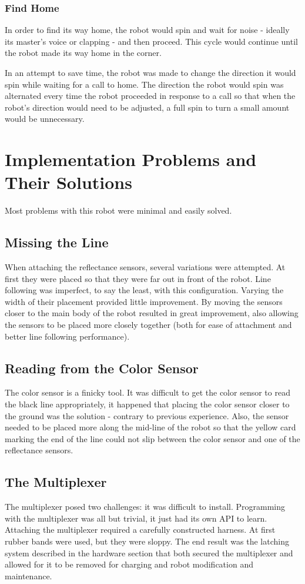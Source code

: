 \documentclass{article}
\begin{document}
\subsubsection{Find Home}
In order to find its way home, the robot would spin and wait for noise - ideally its master's voice or clapping - and then proceed. This cycle would continue until the robot made its way home in the corner.

In an attempt to save time, the robot was made to change the direction it would spin while waiting for a call to home. The direction the robot would spin was alternated every time the robot proceeded in response to a call so that when the robot's direction would need to be adjusted, a full spin to turn a small amount would be unnecessary.

\newpage
\section{Implementation Problems and Their Solutions}
Most problems with this robot were minimal and easily solved.

\subsection{Missing the Line}
When attaching the reflectance sensors, several variations were attempted. At first they were placed so that they were far out in front of the robot. Line following was imperfect, to say the least, with this configuration. Varying the width of their placement provided little improvement. By moving the sensors closer to the main body of the robot resulted in great improvement, also allowing the sensors to be placed more closely together (both for ease of attachment and better line following performance).

\subsection{Reading from the Color Sensor}
The color sensor is a finicky tool. It was difficult to get the color sensor to read the black line appropriately, it happened that placing the color sensor closer to the ground was the solution - contrary to previous experience. Also, the sensor needed to be placed more along the mid-line of the robot so that the yellow card marking the end of the line could not slip between the color sensor and one of the reflectance sensors.

\subsection{The Multiplexer}
The multiplexer posed two challenges: it was difficult to install. Programming with the multiplexer was all but trivial, it just had its own API to learn. Attaching the multiplexer required a carefully constructed harness. At first rubber bands were used, but they were sloppy. The end result was the latching system described in the hardware section that both secured the multiplexer and allowed for it to be removed for charging and robot modification and maintenance.
\end{document}
